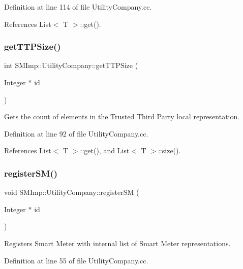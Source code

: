 Definition at line 114 of file Utility\+Company.\+cc.



References List$<$ T $>$\+::get().

\mbox{\label{classSMImp_1_1UtilityCompany_a62d792edc023bd9b8bad3cfdc76f985b}} 
\subsubsection{\texorpdfstring{get\+T\+T\+P\+Size()}{getTTPSize()}}
{\footnotesize\ttfamily int S\+M\+Imp\+::\+Utility\+Company\+::get\+T\+T\+P\+Size (\begin{DoxyParamCaption}\item[{Integer $\ast$}]{id }\end{DoxyParamCaption})}

Gets the count of elements in the Trusted Third Party local representation. 

Definition at line 92 of file Utility\+Company.\+cc.



References List$<$ T $>$\+::get(), and List$<$ T $>$\+::size().

\mbox{\label{classSMImp_1_1UtilityCompany_a08a727386b9f32478395975b062d221f}} 
\subsubsection{\texorpdfstring{register\+S\+M()}{registerSM()}}
{\footnotesize\ttfamily void S\+M\+Imp\+::\+Utility\+Company\+::register\+SM (\begin{DoxyParamCaption}\item[{Integer $\ast$}]{id }\end{DoxyParamCaption})}

Registers Smart Meter with internal list of Smart Meter representations. 

Definition at line 55 of file Utility\+Company.\+cc.



